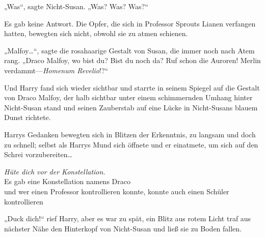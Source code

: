 „Was“, sagte Nicht-Susan. „Was? Was? Was?“

Es gab keine Antwort. Die Opfer, die sich in Professor Sprouts Lianen verfangen hatten, bewegten sich nicht, obwohl sie zu atmen schienen.

„Malfoy…“, sagte die rosahaarige Gestalt von Susan, die immer noch nach Atem rang.
„Draco Malfoy, wo bist du? Bist du noch da? Ruf schon die Auroren! Merlin verdammt—\emph{Homenum Revelio}!?“

Und Harry fand sich wieder sichtbar und starrte in seinem Spiegel auf die Gestalt von Draco Malfoy, der halb sichtbar unter einem schimmernden Umhang hinter Nicht-Susan stand und seinen Zauberstab auf eine Lücke in Nicht-Susans blauem Dunst richtete.

Harrys Gedanken bewegten sich in Blitzen der Erkenntnis, zu langsam und doch zu schnell; selbst als Harrys Mund sich öffnete und er einatmete, um sich auf den Schrei vorzubereiten…

\noindent{}\emph{Hüte dich vor der Konstellation.}\\
Es gab eine Konstellation namens Draco\\
und wer einen Professor kontrollieren konnte, konnte auch einen Schüler kontrollieren

„Duck dich!“ rief Harry, aber es war zu spät, ein Blitz aus rotem Licht traf aus nächster Nähe den Hinterkopf von Nicht-Susan und ließ sie zu Boden fallen.

